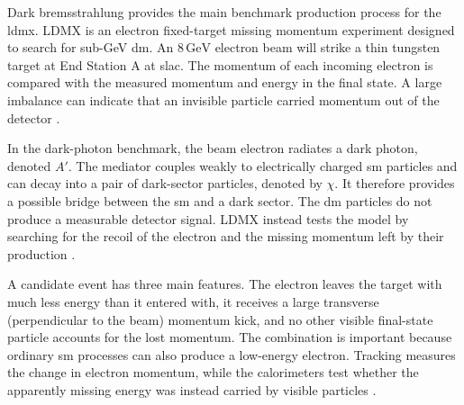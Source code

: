 
Dark bremsstrahlung provides the main benchmark production process for the
\gls{ldmx}. LDMX is an electron fixed-target
\gls{missing momentum experiment} designed to search for sub-GeV \gls{dm}.
An \(8\,\mathrm{GeV}\) electron beam will strike a thin tungsten target at
End Station A at \gls{slac}. The momentum of each incoming electron is
compared with the measured momentum and energy in the final state. A large
imbalance can indicate that an invisible particle carried momentum out of
the detector \cite{ldmx2025-overview}.

In the dark-photon benchmark, the beam electron radiates a
\gls{dark photon}, denoted \(A'\). The mediator couples weakly to electrically
charged \gls{sm} particles and can decay into a pair of dark-sector particles,
denoted by \(\chi\). It therefore provides a possible bridge between the
\gls{sm} and a dark sector. The \gls{dm} particles do not produce a
measurable detector signal. LDMX instead tests the model by searching for the
recoil of the electron and the missing momentum left by their production
\cite{akesson2018-ldmx,ldmx2025-overview}.

A candidate event has three main features. The electron leaves the target
with much less energy than it entered with, it receives a large transverse (perpendicular to the beam)
momentum kick, and no other visible final-state particle accounts for the
lost momentum. The combination is important because ordinary
\gls{sm} processes can also produce a low-energy electron. Tracking measures
the change in electron momentum, while the calorimeters test whether the
apparently missing energy was instead carried by visible particles
\cite{ldmx2025-overview}.

